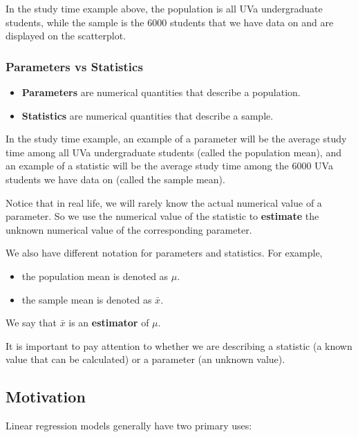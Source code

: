 \documentclass[
]{book}
\providecommand{\tightlist}{%
  \setlength{\itemsep}{0pt}\setlength{\parskip}{0pt}}
\begin{document}
In the study time example above, the population is all UVa undergraduate students, while the sample is the 6000 students that we have data on and are displayed on the scatterplot.

\hypertarget{parameters-vs-statistics}{%
\subsubsection{Parameters vs Statistics}\label{parameters-vs-statistics}}

\begin{itemize}
\tightlist
\item
  \textbf{Parameters} are numerical quantities that describe a population.
\item
  \textbf{Statistics} are numerical quantities that describe a sample.
\end{itemize}

In the study time example, an example of a parameter will be the average study time among all UVa undergraduate students (called the population mean), and an example of a statistic will be the average study time among the 6000 UVa students we have data on (called the sample mean).

Notice that in real life, we will rarely know the actual numerical value of a parameter. So we use the numerical value of the statistic to \textbf{estimate} the unknown numerical value of the corresponding parameter.

We also have different notation for parameters and statistics. For example,

\begin{itemize}
\tightlist
\item
  the population mean is denoted as \(\mu\).
\item
  the sample mean is denoted as \(\bar{x}\).
\end{itemize}

We say that \(\bar{x}\) is an \textbf{estimator} of \(\mu\).

It is important to pay attention to whether we are describing a statistic (a known value that can be calculated) or a parameter (an unknown value).

\hypertarget{motivation}{%
\subsection{Motivation}\label{motivation}}

Linear regression models generally have two primary uses:
\end{document}

